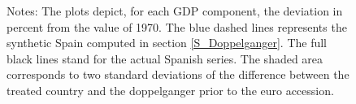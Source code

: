 \documentclass[12pt]{article}
\newcommand{\annote}[1]{\parbox{\textwidth}{\renewcommand{\baselinestretch}{1.0}\vspace{12pt} \small Notes: #1}}
\begin{document}
\begin{appendices}
\begin{figure}[h!]
    \annote{The plots depict, for each GDP component, the deviation in percent from the value of 1970. The blue dashed lines represents the synthetic Spain computed in section \ref{S_Doppelganger}. The full black lines stand for the actual Spanish series. The shaded area corresponds to two standard deviations of the difference between the treated country and the doppelganger prior to the euro accession.}
\end{figure}



\end{appendices}
\end{document}
